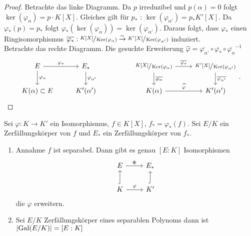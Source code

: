 \begin{proof}
	Betrachte das linke Diagramm.
	Da $p$ irreduzibel und $p(\alpha) = 0$ folgt $\ker(\varphi_{\alpha}) = p \cdot K[X]$.
	Gleiches gilt für $p_{*}$ : $\ker(\varphi_{\alpha'}) = p_{*} K'[X]$.
	Da $\varphi_{*}(p) = p_{*}$ folgt $\varphi_{*}(\ker(\varphi_{\alpha})) = \ker(\varphi_{\alpha'})$.
	Daraus folgt, dass $\varphi_{*}$ einen Ringisomorphismus $\overline{\varphi_{*}}: \sfrac{K[X]}{\operatorname{Ker}(\varphi_{\alpha})} \overset{\sim}{\to} \sfrac{K'[X]}{\operatorname{Ker}(\varphi_{\alpha'})}$ 
	induziert.\\
	Betrachte das rechte Diagramm.
	Die gesuchte Erweiterung $\widehat{\varphi} = \overline{\varphi_{\alpha'}} \circ \overline{\varphi_{*}} \circ \overline{\varphi_{\alpha}}^{-1}$
	\[
	\begin{tikzcd}
		E \arrow[r, "\varphi_*"] \arrow[d, "\varphi_\alpha"] & E_* \arrow[d, "\varphi_{\alpha'}"] &  & \sfrac{K[X]}{\ker(\varphi_{\alpha})}
\arrow[d, "\overline{\varphi_{\alpha}}"] \arrow[r,"\overline{\varphi_{*}}"] & \sfrac{K'[X]}{\ker(\varphi_{\alpha'})} \arrow[d, "\overline{\varphi_{\alpha'}}"] \\
K(\alpha) \subset E                                  & K'(\alpha')                        &  & K(\alpha) \arrow[r, "\widehat{\varphi}"]   & K'(\alpha') 
\end{tikzcd}
	.\] 
\end{proof}

\begin{theorem}
	Sei $\varphi: K \to K'$ ein Isomorphismus, $f \in K[X]$, $f_{*} = \varphi_{*}(f)$.
	Sei $E / K$ ein Zerfällungskörper von $f$ und $E_{*}$ ein Zerfällungskörper von $f_{*}$.
	\begin{enumerate}[(1)]
		\item Annahme $f$ ist separabel. Dann gibt es genau $[E:K]$ Isomorphismen 
			\[
				\begin{tikzcd}
					E \arrow[r, "\Phi"]                    & E_*                \\
					K \arrow[r, "\varphi"] \arrow[u, hook] & K' \arrow[u, hook]
				\end{tikzcd}
			\]
			die $\varphi$ erweitern.
		\item Sei $E / K$ Zerfällungskörper eines separablen Polynoms dann ist $\abs{\operatorname{Gal}(E / K)} = [E:K]$ 
	\end{enumerate}
\end{theorem}

